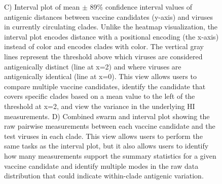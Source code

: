 \documentclass[utf8]{FrontiersinHarvard} %
\begin{document}
\begin{figure}[h!]
{C) Interval plot of mean $\pm$ 89\% confidence interval values of antigenic distances between vaccine candidates (y-axis) and viruses in currently circulating clades.
Unlike the heatmap visualization, the interval plot encodes distance with a positional encoding (the x-axis) instead of color and encodes clades with color.
The vertical gray lines represent the threshold above which viruses are considered antigenically distinct (line at x=2) and where viruses are antigenically identical (line at x=0).
This view allows users to compare multiple vaccine candidates, identify the candidate that covers specific clades based on a mean value to the left of the threshold at x=2, and view the variance in the underlying HI measurements.
D) Combined swarm and interval plot showing the raw pairwise measurements between each vaccine candidate and the test viruses in each clade.
This view allows users to perform the same tasks as the interval plot, but it also allows users to identify how many measurements support the summary statistics for a given vaccine candidate and identify multiple modes in the raw data distribution that could indicate within-clade antigenic variation.
}\label{fig:1}
\end{figure}
\end{document}
